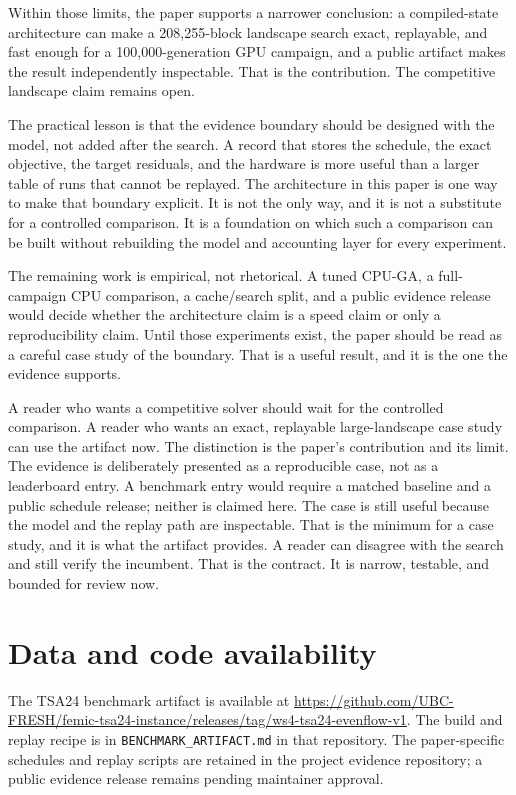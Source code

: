\documentclass[11pt]{article}
\begin{document}
Within those limits, the paper supports a narrower conclusion: a compiled-state
architecture can make a 208,255-block landscape search exact, replayable, and
fast enough for a 100,000-generation GPU campaign, and a public artifact makes
the result independently inspectable. That is the contribution. The competitive
landscape claim remains open.

The practical lesson is that the evidence boundary should be designed with the
model, not added after the search. A record that stores the schedule, the exact
objective, the target residuals, and the hardware is more useful than a larger
table of runs that cannot be replayed. The architecture in this paper is one way
to make that boundary explicit. It is not the only way, and it is not a
substitute for a controlled comparison. It is a foundation on which such a
comparison can be built without rebuilding the model and accounting layer for
every experiment.

The remaining work is empirical, not rhetorical. A tuned CPU-GA, a full-campaign CPU comparison, a
cache/search split, and a public evidence release would decide whether the architecture claim is a
speed claim or only a reproducibility claim. Until those experiments exist, the paper should be read
as a careful case study of the boundary. That is a useful result, and it is the one the evidence
supports.

A reader who wants a competitive solver should wait for the controlled comparison. A reader who wants
an exact, replayable large-landscape case study can use the artifact now. The distinction is the
paper's contribution and its limit. The evidence is deliberately presented as a reproducible case, not as a
leaderboard entry. A benchmark entry would require a matched baseline and a
public schedule release; neither is claimed here. The case is still useful because the model and the replay path
are inspectable. That is the minimum for a case study, and it is what the
artifact provides. A reader can disagree with the search and still verify the
incumbent. That is the contract. It is narrow, testable, and bounded for review now.

\section*{Data and code availability}
The TSA24 benchmark artifact is available at
\url{https://github.com/UBC-FRESH/femic-tsa24-instance/releases/tag/ws4-tsa24-evenflow-v1}.
The build and replay recipe is in \texttt{BENCHMARK\_ARTIFACT.md} in that repository. The paper-specific schedules and replay scripts are retained in the project evidence repository; a public evidence release remains pending maintainer approval.



\end{document}

